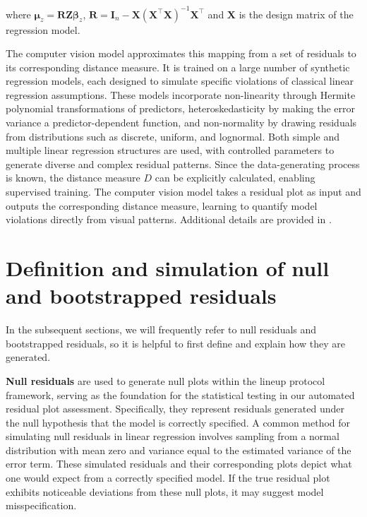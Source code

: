 \documentclass[
doublespace,
  times]{anzsauth}
\begin{document}
where
\(\boldsymbol{\mu}_z = \boldsymbol{R}\boldsymbol{Z}\boldsymbol{\beta}_z\),
\(\boldsymbol{R} = \boldsymbol{I}_n - \boldsymbol{X}(\boldsymbol{X}^\top\boldsymbol{X})^{-1}\boldsymbol{X}^\top\)
and \(\boldsymbol{X}\) is the design matrix of the regression model.

The computer vision model approximates this mapping from a set of
residuals to its corresponding distance measure. It is trained on a
large number of synthetic regression models, each designed to simulate
specific violations of classical linear regression assumptions. These
models incorporate non-linearity through Hermite polynomial
transformations of predictors, heteroskedasticity by making the error
variance a predictor-dependent function, and non-normality by drawing
residuals from distributions such as discrete, uniform, and lognormal.
Both simple and multiple linear regression structures are used, with
controlled parameters to generate diverse and complex residual patterns.
Since the data-generating process is known, the distance measure \(D\)
can be explicitly calculated, enabling supervised training. The computer
vision model takes a residual plot as input and outputs the
corresponding distance measure, learning to quantify model violations
directly from visual patterns. Additional details are provided in
\citet{li2024automated}.

\section{Definition and simulation of null and bootstrapped
residuals}\label{sec-null-and-boot-desc}

In the subsequent sections, we will frequently refer to null residuals
and bootstrapped residuals, so it is helpful to first define and explain
how they are generated.

\textbf{Null residuals} are used to generate null plots within the
lineup protocol framework, serving as the foundation for the statistical
testing in our automated residual plot assessment. Specifically, they
represent residuals generated under the null hypothesis that the model
is correctly specified. A common method for simulating null residuals in
linear regression involves sampling from a normal distribution with mean
zero and variance equal to the estimated variance of the error term.
These simulated residuals and their corresponding plots depict what one
would expect from a correctly specified model. If the true residual plot
exhibits noticeable deviations from these null plots, it may suggest
model misspecification.
\end{document}
